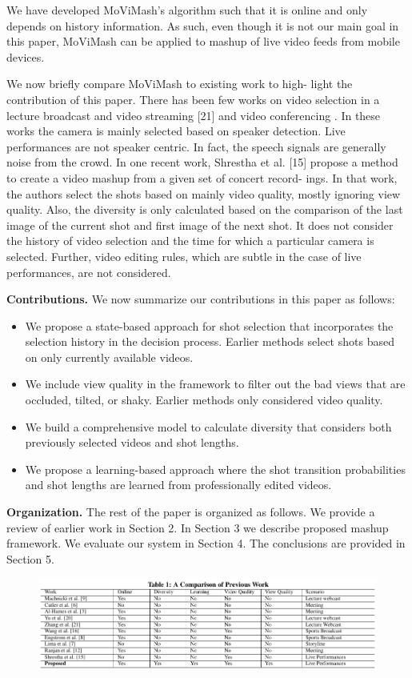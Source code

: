 \documentclass{sig-alternate}
\begin{document}
We have developed MoViMash’s algorithm such that it is online
and only depends on history information. As such, even though
it is not our main goal in this paper, MoViMash can be applied to
mashup of live video feeds from mobile devices.

We now briefly compare MoViMash to existing work to high-
light the contribution of this paper. There has been few works on
video selection in a lecture broadcast and video streaming [21] \cite{asd:zxc}
and video conferencing \cite{hames:ml}. In these works the camera is mainly
selected based on speaker detection. Live performances are not
speaker centric. In fact, the speech signals are generally noise from
the crowd. In one recent work, Shrestha et al. [15] propose a
method to create a video mashup from a given set of concert record-
ings. In that work, the authors select the shots based on mainly
video quality, mostly ignoring view quality. Also, the diversity is
only calculated based on the comparison of the last image of the
current shot and first image of the next shot. It does not consider
the history of video selection and the time for which a particular
camera is selected. Further, video editing rules, which are subtle in
the case of live performances, are not considered.

\textbf{Contributions.} We now summarize our contributions in this paper as follows:
\begin{itemize}
    \item We propose a state-based approach for shot selection that incorporates the selection history in the decision process. Earlier methods select shots based on only currently available videos.
    \item We include view quality in the framework to filter out the bad views that are occluded, tilted, or shaky. Earlier methods only considered video quality.
    \item We build a comprehensive model to calculate diversity that considers both previously selected videos and shot lengths.
    \item We propose a learning-based approach where the shot transition probabilities and shot lengths are learned from professionally edited videos.
\end{itemize}

\textbf{Organization.} The rest of the paper is organized as follows.
We provide a review of earlier work in Section 2. In Section 3 we
describe proposed mashup framework. We evaluate our system in
Section 4. The conclusions are provided in Section 5.
\begin{figure}{
\centering
\includegraphics{image2.pdf}}
\end{figure}
\end{document}
